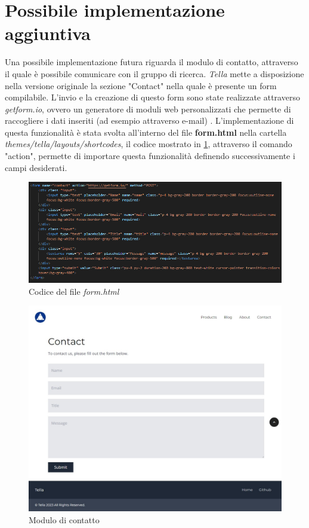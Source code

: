 \documentclass[target=bach,aauheader=]{thud}
\begin{document}
\section{Possibile implementazione aggiuntiva}
Una possibile implementazione futura riguarda il modulo di contatto, attraverso il quale è possibile comunicare con il gruppo di ricerca.
\textit{Tella} mette a disposizione nella versione originale la sezione "Contact" nella quale è presente un form compilabile.
L'invio e la creazione di questo form sono state realizzate attraverso \textit{getform.io}, ovvero un generatore di moduli web personalizzati che permette di raccogliere i dati inseriti (ad esempio attraverso e-mail) \cite{getform}. 
L'implementazione di questa funzionalità è stata svolta all'interno del file \textbf{form.html} nella cartella \textit{themes/tella/layouts/shortcodes}, il codice mostrato in \cref{img:formc}, attraverso il comando "action", permette di importare questa funzionalità definendo successivamente i campi desiderati.

\begin{figure}
    \centering
      \includegraphics[width=1\textwidth]{images/form-html.png}
      \caption{Codice del file \textit{form.html}}
      \label{img:formc}
\end{figure}

\begin{figure}
    \centering
    \includegraphics[width = 1\textwidth]{images/form-tella.png}
    \caption{Modulo di contatto} 
\end{figure}
\end{document}
